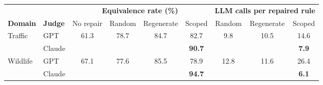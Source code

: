\documentclass[border=8pt,12pt]{standalone}
\begin{document}
\renewcommand{\arraystretch}{1.35}
\begin{tabular}{@{}llcccc@{\hskip 18pt}ccc@{}}
\toprule
& & \multicolumn{4}{c}{\textbf{Equivalence rate (\%)}} & \multicolumn{3}{c}{\textbf{LLM calls per repaired rule}} \\
\cmidrule(lr){3-6} \cmidrule(l){7-9}
\textbf{Domain} & \textbf{Judge} & No repair & Random & Regenerate & Scoped & Random & Regenerate & Scoped \\
\midrule
\multirow{2}{*}{Traffic}  & GPT    & 61.3 & 78.7 & 84.7 & \cellcolor{red!15}82.7 & 9.8 & 10.5 & \cellcolor{red!15}14.6 \\
                          & Claude &      &      &      & \cellcolor{green!25}\textbf{90.7} & & & \cellcolor{green!25}\textbf{7.9} \\
\midrule
\multirow{2}{*}{Wildlife} & GPT    & 67.1 & 77.6 & 85.5 & \cellcolor{red!15}78.9 & 12.8 & 11.6 & \cellcolor{red!15}26.4 \\
                          & Claude &      &      &      & \cellcolor{green!25}\textbf{94.7} & & & \cellcolor{green!25}\textbf{6.1} \\
\bottomrule
\end{tabular}
\end{document}
